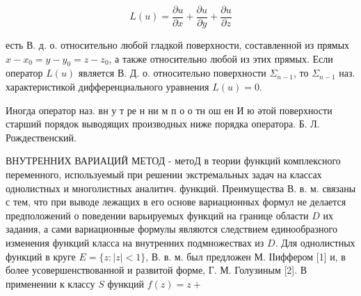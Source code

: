 \documentclass[10pt]{article}
\begin{document}
\[

L(u)=\frac{\partial u}{\partial x}+\frac{\partial u}{\partial y}+\frac{\partial u}{\partial z}

\]



есть В. д. о. относительно любой гладкой поверхности, составленной из прямых $x-x_{0}=y-y_{0}=z-z_{0}$, а также относительно любой из этих прямых. Если оператор $L(u)$ является В. Д. о. относительно поверхности $\Sigma_{n-1}$, то $\Sigma_{n-1}$ наз. характеристикой дифференциального уравнения $L(u)=0$.



Иногда оператор наз. вн у т ре н ни м п о о тн ош ен И ю әтой поверхности старший порядок выводящих производных ниже порядка оператора. Б. Л. Рождественский.



ВНУТРЕННИХ ВАРИАЦИЙ МЕТОД - метоД в теории функций комплексного переменного, используемый при решении экстремальных задач на классах однолистных и многолистных аналитич. функций. Преимущества В. в. м. связаны с тем, что при выводе лежащих в его основе вариационных формул не делается предположений о поведении варьируемых функций на границе области $D$ их задания, а сами вариационные формулы являются следствием единообразного изменения функций класса на внутренних подмножествах из $D$. Для однолистных функций в круге $E=\{z:|z|<1\}$, В. в. м. был предложен М. ІІиффером [1] и, в более усовершенствованной и развитой форме, Г. М. Голузиным [2]. В применении к классу $S$ функций $f(z)=z+$
\end{document}

